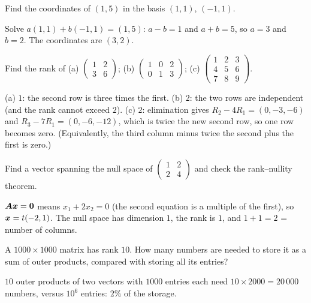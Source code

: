 \sectionexercises

\begin{exercise}
Find the coordinates of $(1, 5)$ in the basis $(1, 1)$, $(-1, 1)$.
\end{exercise}
\begin{solution}
Solve $a(1,1) + b(-1,1) = (1, 5)$: $a - b = 1$ and $a + b = 5$, so $a = 3$ and
$b = 2$. The coordinates are $(3, 2)$.
\end{solution}

\begin{exercise}
Find the rank of (a) $\left(\begin{smallmatrix} 1 & 2\\ 3 & 6\end{smallmatrix}\right)$;
(b) $\left(\begin{smallmatrix} 1 & 0 & 2\\ 0 & 1 & 3\end{smallmatrix}\right)$;
(c) $\left(\begin{smallmatrix} 1 & 2 & 3\\ 4 & 5 & 6\\ 7 & 8 &
9\end{smallmatrix}\right)$.
\end{exercise}
\begin{solution}
(a) $1$: the second row is three times the first. (b) $2$: the two rows are
independent (and the rank cannot exceed $2$). (c) $2$: elimination gives
$R_2 - 4R_1 = (0, -3, -6)$ and $R_3 - 7R_1 = (0, -6, -12)$, which is twice the
new second row, so one row becomes zero. (Equivalently, the third column minus
twice the second plus the first is zero.)
\end{solution}

\begin{exercise}
Find a vector spanning the null space of
$\left(\begin{smallmatrix} 1 & 2\\ 2 & 4\end{smallmatrix}\right)$ and check
the rank--nullity theorem.
\end{exercise}
\begin{solution}
$\bm{A}\bm{x} = \bm{0}$ means $x_1 + 2x_2 = 0$ (the second equation is a multiple of
the first), so $\bm{x} = t(-2, 1)$. The null space has dimension $1$, the rank is
$1$, and $1 + 1 = 2$ = number of columns.
\end{solution}

\begin{exercise}
A $1000 \times 1000$ matrix has rank $10$. How many numbers are needed to store
it as a sum of outer products, compared with storing all its entries?
\end{exercise}
\begin{solution}
$10$ outer products of two vectors with $1000$ entries each need
$10 \times 2000 = 20\,000$ numbers, versus $10^6$ entries: $2\%$ of the
storage.
\end{solution}

